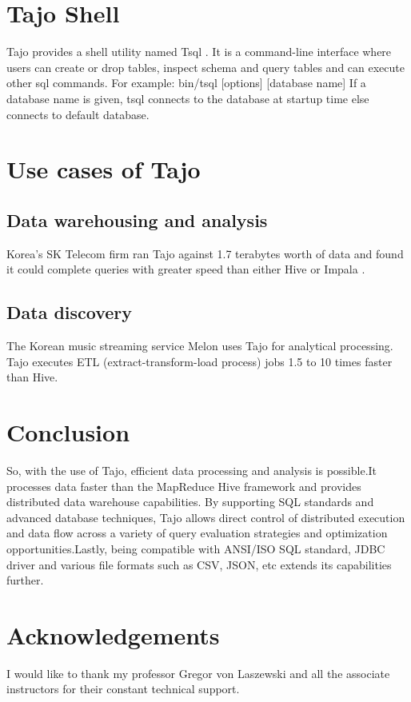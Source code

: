 \documentclass[9pt,twocolumn,twoside]{../../styles/osajnl}
\begin{document}
\section{Tajo Shell}
Tajo provides a shell utility named Tsql
\cite{www-apache-tajo-tsql}. It is a command-line interface where
users can create or drop tables, inspect schema and query tables and
can execute other sql commands.\newline \newline
\noindent
For example: bin/tsql [options] [database name] \newline If a database
name is given, tsql connects to the database at startup time else
connects to default database.

\section{Use cases of Tajo}
\subsection{Data warehousing and analysis}
Korea's SK Telecom firm \cite{www-apache-tajo-tutorialspoint} ran Tajo
against 1.7 terabytes worth of data and found it could complete
queries with greater speed than either Hive or Impala \cite{www-impala}.

\subsection{Data discovery}
The Korean music streaming \cite{www-apache-tajo-tutorialspoint}
service Melon uses Tajo for analytical processing. Tajo executes ETL
(extract-transform-load process) jobs 1.5 to 10 times faster than
Hive.

\section{Conclusion}
So, with the use of Tajo, efficient data processing and analysis is
possible.It processes data faster than the MapReduce Hive framework
and provides distributed data warehouse capabilities. By supporting
SQL standards and advanced database techniques, Tajo allows direct
control of distributed execution and data flow across a variety of
query evaluation strategies and optimization opportunities.Lastly,
being compatible with ANSI/ISO SQL standard, JDBC \cite{www-jdbc}
driver and various file formats such as CSV, JSON, etc extends
its capabilities further.

\section*{Acknowledgements}

I would like to thank my professor Gregor von Laszewski and all the
associate instructors for their constant technical support.



 


\newpage

\appendix
\end{document}

